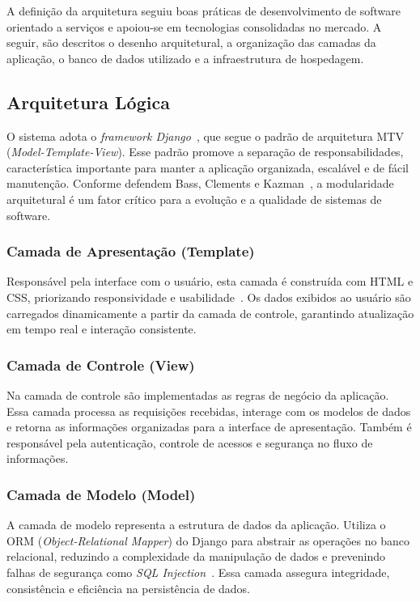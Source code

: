 \documentclass[
	12pt,				%
	openany,			%
	oneside,			%
	a4paper,			%
	english,			%
	french,				%
	spanish,			%
	brazil				%
	]{abntex2}
\begin{document}
A definição da arquitetura seguiu boas práticas de desenvolvimento de software orientado a serviços e apoiou-se em tecnologias consolidadas no mercado. A seguir, são descritos o desenho arquitetural, a organização das camadas da aplicação, o banco de dados utilizado e a infraestrutura de hospedagem.

\subsection{Arquitetura Lógica}

O sistema adota o \textit{framework Django}~\cite{django}, que segue o padrão de arquitetura MTV (\textit{Model-Template-View}). Esse padrão promove a separação de responsabilidades, característica importante para manter a aplicação organizada, escalável e de fácil manutenção. Conforme defendem Bass, Clements e Kazman~\cite{bass2012}, a modularidade arquitetural é um fator crítico para a evolução e a qualidade de sistemas de software.

\subsubsection{Camada de Apresentação (Template)}

Responsável pela interface com o usuário, esta camada é construída com HTML e CSS, priorizando responsividade e usabilidade~\cite{duckett}. Os dados exibidos ao usuário são carregados dinamicamente a partir da camada de controle, garantindo atualização em tempo real e interação consistente.

\subsubsection{Camada de Controle (View)}

Na camada de controle são implementadas as regras de negócio da aplicação. Essa camada processa as requisições recebidas, interage com os modelos de dados e retorna as informações organizadas para a interface de apresentação. Também é responsável pela autenticação, controle de acessos e segurança no fluxo de informações.

\subsubsection{Camada de Modelo (Model)}

A camada de modelo representa a estrutura de dados da aplicação. Utiliza o ORM (\textit{Object-Relational Mapper}) do Django para abstrair as operações no banco relacional, reduzindo a complexidade da manipulação de dados e prevenindo falhas de segurança como \textit{SQL Injection}~\cite{postgresql}. Essa camada assegura integridade, consistência e eficiência na persistência de dados.
\end{document}

